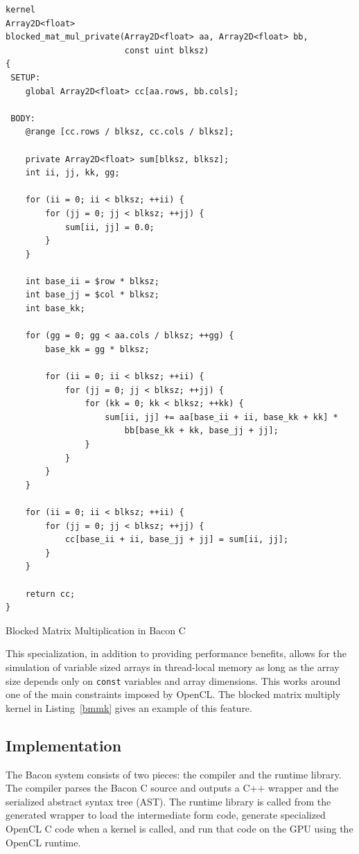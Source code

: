 \documentclass{llncs}
\begin{document}
\begin{listing}[t!]
\begin{verbatim}
kernel
Array2D<float>
blocked_mat_mul_private(Array2D<float> aa, Array2D<float> bb, 
                        const uint blksz)
{
 SETUP:
    global Array2D<float> cc[aa.rows, bb.cols];

 BODY:
    @range [cc.rows / blksz, cc.cols / blksz];

    private Array2D<float> sum[blksz, blksz];
    int ii, jj, kk, gg;

    for (ii = 0; ii < blksz; ++ii) {
        for (jj = 0; jj < blksz; ++jj) {
            sum[ii, jj] = 0.0;
        }
    }

    int base_ii = $row * blksz;
    int base_jj = $col * blksz;
    int base_kk;

    for (gg = 0; gg < aa.cols / blksz; ++gg) {
        base_kk = gg * blksz;

        for (ii = 0; ii < blksz; ++ii) {
            for (jj = 0; jj < blksz; ++jj) {
                for (kk = 0; kk < blksz; ++kk) {
                    sum[ii, jj] += aa[base_ii + ii, base_kk + kk] * 
                        bb[base_kk + kk, base_jj + jj];
                }
            }
        }
    }

    for (ii = 0; ii < blksz; ++ii) {
        for (jj = 0; jj < blksz; ++jj) {
            cc[base_ii + ii, base_jj + jj] = sum[ii, jj];
        }
    }

    return cc;
}
\end{verbatim}
\caption{Blocked Matrix Multiplication in Bacon C}\label{bmmk}
\end{listing}
\afterpage{\FloatBarrier}

This specialization, in addition to providing performance benefits,
allows for the simulation of variable sized arrays in thread-local
memory as long as the array size depends only on {\tt const} variables
and array dimensions. This works around one of the main constraints
imposed by OpenCL. The blocked matrix multiply kernel in
Listing~\ref{bmmk} gives an example of this feature.

\subsection{Implementation}

The Bacon system consists of two pieces: the compiler and the runtime
library. The compiler parses the Bacon C source and outputs a C++
wrapper and the serialized abstract syntax tree (AST). The runtime
library is called from the generated wrapper to load the intermediate
form code, generate specialized OpenCL C code when a kernel is called,
and run that code on the GPU using the OpenCL runtime.
\end{document}
